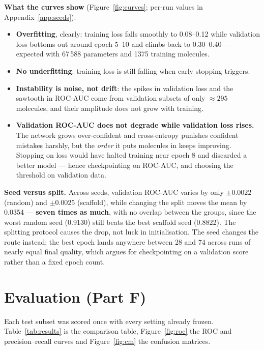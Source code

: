 \documentclass[10pt]{article}
\begin{document}
\textbf{What the curves show} (Figure~\ref{fig:curves}; per-run values in Appendix~\ref{app:seeds}).
\begin{itemize}
    \item \textbf{Overfitting}, clearly: training loss falls smoothly to 0.08--0.12 while validation loss bottoms out around epoch 5--10 and climbs back to 0.30--0.40 --- expected with 67\,588 parameters and 1375 training molecules.
    \item \textbf{No underfitting}: training loss is still falling when early stopping triggers.
    \item \textbf{Instability is noise, not drift}: the spikes in validation loss and the sawtooth in ROC-AUC come from validation subsets of only $\approx 295$ molecules, and their amplitude does not grow with training.
    \item \textbf{Validation ROC-AUC does not degrade while validation loss rises.} The network grows over-confident and cross-entropy punishes confident mistakes harshly, but the \emph{order} it puts molecules in keeps improving. Stopping on loss would have halted training near epoch 8 and discarded a better model --- hence checkpointing on ROC-AUC, and choosing the threshold on validation data.
\end{itemize}

\textbf{Seed versus split.} Across seeds, validation ROC-AUC varies by only $\pm 0.0022$ (random) and $\pm 0.0025$
(scaffold), while changing the split moves the mean by 0.0354 --- \textbf{seven times as much}, with no overlap
between the groups, since the worst random seed (0.9130) still beats the best scaffold seed (0.8822). The splitting
protocol causes the drop, not luck in initialisation. The seed changes the route instead: the best epoch lands
anywhere between 28 and 74 across runs of nearly equal final quality, which argues for checkpointing on a validation
score rather than a fixed epoch count.

\section{Evaluation (Part F)}
\label{sec:eval}

Each test subset was scored once with every setting already frozen. Table~\ref{tab:results} is the comparison table,
Figure~\ref{fig:roc} the ROC and precision--recall curves and Figure~\ref{fig:cm} the confusion matrices.
\end{document}
